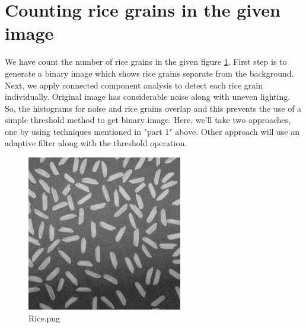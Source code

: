 \documentclass[11pt, a4paper]{article}
\begin{document}
\section{Counting rice grains in the given image}
\begin{minipage}{.8\textwidth}
We have count the number of rice grains in the given figure \ref{fig:Rice image}. First step is to generate a binary image which shows rice grains separate from the background. Next, we apply connected component analysis to detect each rice grain individually. Original image has considerable noise along with uneven lighting. So, the histograms for noise and rice grains overlap and this prevents the use of a simple threshold method to get binary image. Here, we'll take two approaches, one by using techniques mentioned in "part 1" above. Other approach will use an adaptive filter along with the threshold operation.\\
\end{minipage}
\hfill
\begin{minipage}{.18\textwidth}
\begin{figure}[H]
	\centering
	\includegraphics[width=.95\textwidth]{./a01images/rice.png}
	\caption{Rice.png}
	\label{fig:Rice image}
\end{figure}
\end{minipage}
\end{document}
